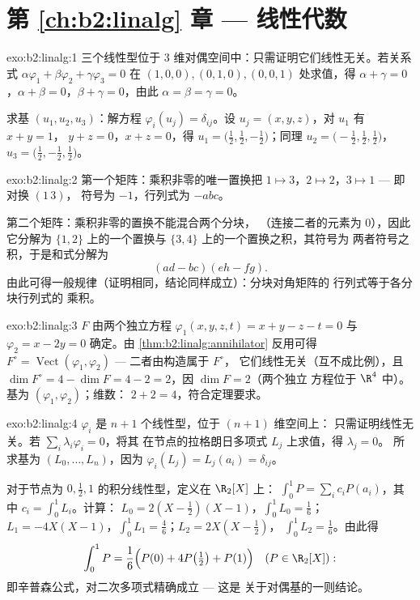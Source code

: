 \section*{第 \ref{ch:b2:linalg} 章 --- 线性代数}

\begin{solution}{exo:b2:linalg:1}
三个线性型位于 $3$ 维对偶空间中：只需证明它们线性无关。若关系式
$\alpha\varphi_1 + \beta\varphi_2 + \gamma\varphi_3 = 0$ 在
$(1,0,0), (0,1,0), (0,0,1)$ 处求值，得 $\alpha + \gamma = 0$，$\alpha +
\beta = 0$，$\beta + \gamma = 0$，由此 $\alpha = \beta = \gamma =
0$。

求基 $(u_1, u_2, u_3)$：解方程 $\varphi_i(u_j) =
\delta_{ij}$。设 $u_j = (x, y, z)$，对 $u_1$ 有 $x + y = 1$，
$y + z = 0$，$x + z = 0$，得 $u_1 = \bigl(\tfrac12, \tfrac12,
-\tfrac12\bigr)$；同理 $u_2 = \bigl(-\tfrac12, \tfrac12,
\tfrac12\bigr)$，$u_3 = \bigl(\tfrac12, -\tfrac12, \tfrac12\bigr)$。
\end{solution}

\begin{solution}{exo:b2:linalg:2}
第一个矩阵：乘积非零的唯一置换把 $1 \mapsto
3$，$2 \mapsto 2$，$3 \mapsto 1$ --- 即对换 $(1\,3)$，
符号为 $-1$，行列式为 $-abc$。

第二个矩阵：乘积非零的置换不能混合两个分块，
（连接二者的元素为 $0$），因此它分解为
$\{1,2\}$ 上的一个置换与 $\{3,4\}$ 上的一个置换之积，其符号为
两者符号之积，于是和式分解为
\[
(ad - bc)(eh - fg) .
\]
由此可得一般规律（证明相同，结论同样成立）：分块对角矩阵的
行列式等于各分块行列式的
乘积。
\end{solution}

\begin{solution}{exo:b2:linalg:3}
$F$ 由两个独立方程 $\varphi_1(x,y,z,t)
= x + y - z - t = 0$ 与 $\varphi_2 = x - 2y = 0$ 确定。由
\cref{thm:b2:linalg:annihilator} 反用可得 $F^\circ =
\operatorname{Vect}(\varphi_1, \varphi_2)$ --- 二者由构造属于 $F^\circ$，
它们线性无关（互不成比例），且 $\dim F^\circ
= 4 - \dim F = 4 - 2 = 2$，因 $\dim F = 2$（两个独立
方程位于 $\R^4$ 中）。基为 $(\varphi_1, \varphi_2)$；维数：
$2 + 2 = 4$，符合定理要求。
\end{solution}

\begin{solution}{exo:b2:linalg:4}
$\varphi_i$ 是 $n + 1$ 个线性型，位于 $(n+1)$ 维空间上：
只需证明线性无关。若 $\sum_i \lambda_i \varphi_i = 0$，将其
在节点的拉格朗日多项式 $L_j$ 上求值，得 $\lambda_j = 0$。
所求基为 $(L_0, \dots, L_n)$，因为 $\varphi_i(L_j) =
L_j(a_i) = \delta_{ij}$。

对于节点为 $0, \frac12, 1$ 的积分线性型，定义在 $\R_2[X]$ 上：
$\int_0^1 P = \sum_i c_i P(a_i)$，其中 $c_i = \int_0^1 L_i$。计算：
$L_0 = 2(X - \tfrac12)(X - 1)$，$\int_0^1 L_0 = \frac16$；$L_1 =
-4X(X-1)$，$\int_0^1 L_1 = \frac46$；$L_2 = 2X(X - \tfrac12)$，
$\int_0^1 L_2 = \frac16$。由此得
\[
\int_0^1 P = \frac{1}{6}\Bigl(P(0) + 4P\bigl(\tfrac12\bigr) +
P(1)\Bigr)
\quad (P \in \R_2[X]) :
\]
即辛普森公式，对二次多项式精确成立 --- 这是
关于对偶基的一则结论。
\end{solution}

